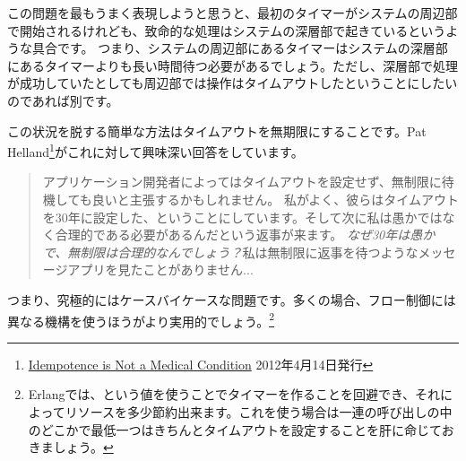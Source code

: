 この問題を最もうまく表現しようと思うと、最初のタイマーがシステムの周辺部で開始されるけれども、致命的な処理はシステムの深層部で起きているというような具合です。
つまり、システムの周辺部にあるタイマーはシステムの深層部にあるタイマーよりも長い時間待つ必要があるでしょう。ただし、深層部で処理が成功していたとしても周辺部では操作はタイムアウトしたということにしたいのであれば別です。

この状況を脱する簡単な方法はタイムアウトを無期限にすることです。Pat Helland\footnote{\href{http://queue.acm.org/detail.cfm?id=2187821}{Idempotence is Not a Medical Condition} 2012年4月14日発行}がこれに対して興味深い回答をしています。

\begin{quote}
  アプリケーション開発者によってはタイムアウトを設定せず、無制限に待機しても良いと主張するかもしれません。
  私がよく、彼らはタイムアウトを30年に設定した、ということにしています。そして次に私は愚かではなく合理的である必要があるんだという返事が来ます。
  \emph{なぜ30年は愚かで、無制限は合理的なんでしょう？}私は無制限に返事を待つようなメッセージアプリを見たことがありません...
\end{quote}

つまり、究極的にはケースバイケースな問題です。多くの場合、フロー制御には異なる機構を使うほうがより実用的でしょう。\footnote{Erlangでは、という値を使うことでタイマーを作ることを回避でき、それによってリソースを多少節約出来ます。これを使う場合は一連の呼び出しの中のどこかで最低一つはきちんとタイムアウトを設定することを肝に命じておきましょう。}

